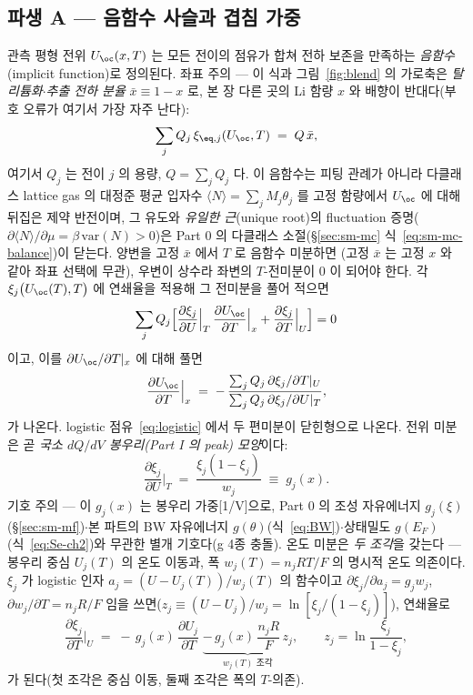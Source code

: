 \subsection{파생 A --- 음함수 사슬과 겹침 가중}\label{ssec:overlap}
관측 평형 전위 $U_\oc(x,T)$ 는 모든 전이의 점유가 합쳐 전하 보존을 만족하는 \emph{음함수}(implicit function)로 정의된다. 좌표 주의
--- 이 식과 그림~\ref{fig:blend} 의 가로축은 \emph{탈리튬화$\cdot$추출 전하 분율} $\bar x\equiv1-x$ 로, 본 장
다른 곳의 Li 함량 $x$ 와 배향이 반대다(부호 오류가 여기서 가장 자주 난다):
\begin{equation}
\sum_j Q_j\,\xi_{\eq,j}(U_\oc,T) \;=\; Q\,\bar x,
\label{eq:implicit}
\end{equation}
여기서 $Q_j$ 는 전이 $j$ 의 용량, $Q=\sum_j Q_j$ 다. 이 음함수는 피팅 관례가 아니라 다클래스 lattice gas 의
대정준 평균 입자수 $\langle N\rangle=\sum_jM_j\theta_j$ 를 고정 함량에서 $U_\oc$ 에 대해 뒤집은 제약
반전이며, 그 유도와 \emph{유일한 근}(unique root)의 fluctuation 증명($\partial\langle N\rangle/\partial\mu=\beta\,\mathrm{var}(N)>0$)은
Part 0 의 다클래스 소절(\S\ref{sec:sm-mc} 식~\eqref{eq:sm-mc-balance})이 닫는다. 양변을 고정 $\bar x$ 에서 $T$ 로 음함수 미분하면
(고정 $\bar x$ 는 고정 $x$ 와 같아 좌표 선택에 무관), 우변이 상수라 좌변의 $T$-전미분이 $0$ 이 되어야
한다. 각 $\xi_j\bigl(U_\oc(T),T\bigr)$ 에 연쇄율을 적용해 그 전미분을 풀어 적으면
\[
\sum_j Q_j\Big[\frac{\partial\xi_j}{\partial U}\Big|_T\,\frac{\partial U_\oc}{\partial T}\Big|_x
+\frac{\partial\xi_j}{\partial T}\Big|_U\Big]=0
\]
이고, 이를 $\partial U_\oc/\partial T|_x$ 에 대해 풀면
\begin{equation}
\frac{\partial U_\oc}{\partial T}\Big|_x
\;=\; -\,\frac{\sum_j Q_j\,\partial\xi_j/\partial T|_U}{\sum_j Q_j\,\partial\xi_j/\partial U|_T},
\label{eq:implicit_diff}
\end{equation}
가 나온다. logistic 점유~\eqref{eq:logistic} 에서 두 편미분이 닫힌형으로 나온다. 전위 미분은 곧 \emph{국소
$dQ/dV$ 봉우리(Part I 의 peak) 모양}이다:
\begin{equation}
\frac{\partial\xi_j}{\partial U}\Big|_T \;=\; \frac{\xi_j(1-\xi_j)}{w_j} \;\equiv\; g_j(x).
\label{eq:gj}
\end{equation}
기호 주의 --- 이 $g_j(x)$ 는 봉우리 가중[1/V]으로, Part 0 의 조성 자유에너지 $g_j(\xi)$(\S\ref{sec:sm-mf})$\cdot$본 파트의
BW 자유에너지 $g(\theta)$(식~\eqref{eq:BW})$\cdot$상태밀도 $g(E_F)$(식~\eqref{eq:Se-ch2})와 무관한 별개
기호다(g 4종 충돌). 온도 미분은 \emph{두 조각}을 갖는다 --- 봉우리 중심 $U_j(T)$ 의 온도 이동과,
폭 $w_j(T)=n_jRT/F$ 의 명시적 온도 의존이다. $\xi_j$ 가 logistic 인자 $a_j=(U-U_j(T))/w_j(T)$ 의 함수이고
$\partial\xi_j/\partial a_j=g_j w_j$, $\partial w_j/\partial T=n_jR/F$ 임을 쓰면($z_j\equiv(U-U_j)/w_j=\ln[\xi_j/
(1-\xi_j)]$), 연쇄율로
\begin{equation}
\frac{\partial\xi_j}{\partial T}\Big|_U
\;=\; -\,g_j(x)\,\frac{\partial U_j}{\partial T}
\;\underbrace{-\,g_j(x)\,\frac{n_jR}{F}\,z_j}_{w_j(T)\text{ 조각}},
\qquad z_j=\ln\frac{\xi_j}{1-\xi_j},
\label{eq:dxidT}
\end{equation}
가 된다(첫 조각은 중심 이동, 둘째 조각은 폭의 $T$-의존).

